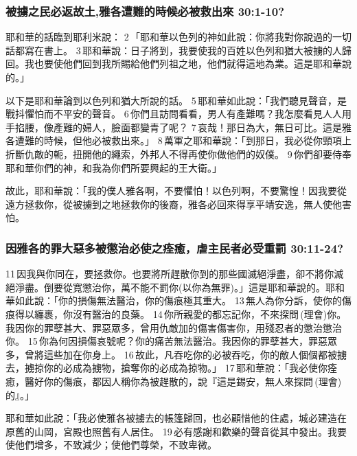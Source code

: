 \subsubsection{被擄之民必返故土,雅各遭難的時候必被救出來 30:1-10?}
耶和華的話臨到耶利米說： 2 「耶和華以色列的神如此說：你將我對你說過的一切話都寫在書上。 3 耶和華說：日子將到，我要使我的百姓以色列和猶大被擄的人歸回。我也要使他們回到我所賜給他們列祖之地，他們就得這地為業。這是耶和華說的。」

以下是耶和華論到以色列和猶大所說的話。 5 耶和華如此說：「我們聽見聲音，是戰抖懼怕而不平安的聲音。 6 你們且訪問看看，男人有產難嗎？我怎麼看見人人用手掐腰，像產難的婦人，臉面都變青了呢？ 7 哀哉！那日為大，無日可比。這是雅各遭難的時候，但他必被救出來。」 8 萬軍之耶和華說：「到那日，我必從你頸項上折斷仇敵的軛，扭開他的繩索，外邦人不得再使你做他們的奴僕。 9 你們卻要侍奉耶和華你們的神，和我為你們所要興起的王大衛。」

故此，耶和華說：「我的僕人雅各啊，不要懼怕！以色列啊，不要驚惶！因我要從遠方拯救你，從被擄到之地拯救你的後裔，雅各必回來得享平靖安逸，無人使他害怕。 


\subsubsection{因雅各的罪大惡多被懲治必使之痊癒，虐主民者必受重罰 30:11-24?}
11 因我與你同在，要拯救你。也要將所趕散你到的那些國滅絕淨盡，卻不將你滅絕淨盡。倒要從寬懲治你，萬不能不罰你(以你為無罪)。」這是耶和華說的。耶和華如此說：「你的損傷無法醫治，你的傷痕極其重大。 13 無人為你分訴，使你的傷痕得以纏裹，你沒有醫治的良藥。 14 你所親愛的都忘記你，不來探問 (理會)你。我因你的罪孽甚大、罪惡眾多，曾用仇敵加的傷害傷害你，用殘忍者的懲治懲治你。 15 你為何因損傷哀號呢？你的痛苦無法醫治。我因你的罪孽甚大，罪惡眾多，曾將這些加在你身上。 16 故此，凡吞吃你的必被吞吃，你的敵人個個都被擄去，擄掠你的必成為擄物，搶奪你的必成為掠物。」 17 耶和華說：「我必使你痊癒，醫好你的傷痕，都因人稱你為被趕散的，說『這是錫安，無人來探問 (理會)的』。」

耶和華如此說：「我必使雅各被擄去的帳篷歸回，也必顧惜他的住處，城必建造在原舊的山岡，宮殿也照舊有人居住。 19 必有感謝和歡樂的聲音從其中發出。我要使他們增多，不致減少；使他們尊榮，不致卑微。

